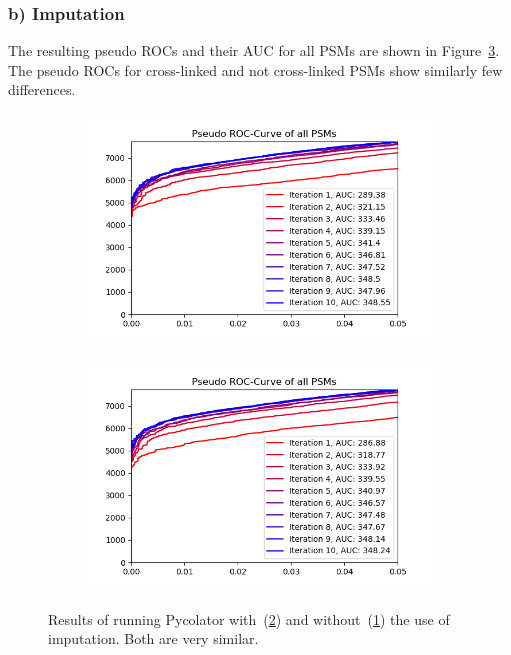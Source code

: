 \subsubsection{b) Imputation}
\label{lab:results:imputation}
The resulting pseudo ROCs and their AUC for all PSMs are shown in Figure~\ref{fig:results:imputation}. The pseudo ROCs for cross-linked and not cross-linked PSMs show similarly few differences.
\renewcommand{\baselinestretch}{0.9}
\begin{figure}
	\normalsize
	\centering
	\begin{subfigure}{0.49 \textwidth}
		\includegraphics[width = \textwidth]{figures/no_imputation.png}
		\caption{}
		\label{fig:results:imputation_no}
	\end{subfigure}
	\hfill
	\begin{subfigure}{0.49 \textwidth}
		\includegraphics[width = \textwidth]{figures/imputation.png}
		\caption{}
		\label{fig:results:imputation_yes}
	\end{subfigure}
	\caption[Effect of imputation on model performance]{Results of running Pycolator with~(\ref{fig:results:imputation_yes}) and without~(\ref{fig:results:imputation_no}) the use of imputation. Both are very similar.}
	\label{fig:results:imputation}
\end{figure}
\renewcommand{\baselinestretch}{1}

